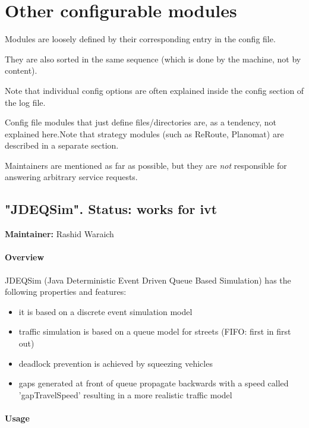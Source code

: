 \documentclass[a4paper,11pt]{report}
\begin{document}
\chapter{Other configurable modules}

Modules are loosely defined by their corresponding entry in the config file.

They are also sorted in the same sequence (which is done by the machine, not by content).

Note that individual config options are often explained inside the config section of the log file.

Config file modules that just define files/directories are, as a tendency, not explained here.Note that strategy modules (such as ReRoute, Planomat) are described in a separate section.

Maintainers are mentioned as far as possible, but they are \emph{not} responsible for answering arbitrary service requests.

\vfill\eject
\section{"JDEQSim".  Status: works for ivt}

\textbf{Maintainer:} Rashid Waraich

\subsubsection{Overview}

JDEQSim (Java Deterministic Event Driven Queue Based Simulation) has the following properties and features:
\begin{itemize}
	\item it is based on a discrete event simulation model
	\item traffic simulation is based on a queue model for streets (FIFO: first in first out)
	\item deadlock prevention is achieved by squeezing vehicles
	\item gaps  generated at front of queue propagate backwards with a speed called  'gapTravelSpeed' resulting in a more realistic traffic model
\end{itemize}

\subsubsection{Usage}
\end{document}
